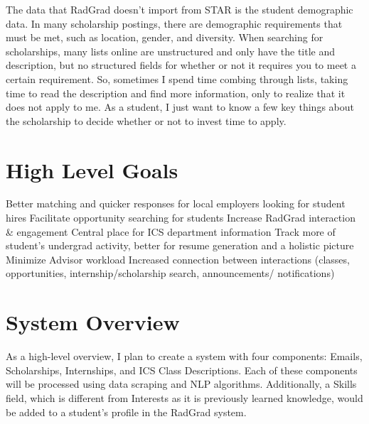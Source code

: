 \documentclass[english]{proposalnsf}
\begin{document}
	The data that RadGrad doesn’t import from STAR is the student demographic data.
	In many scholarship postings, there are demographic requirements that must be met, such as location, gender, and diversity. When searching for scholarships, many lists online are unstructured and only have the title and description, but no structured fields for whether or not it requires you to meet a certain requirement. So, sometimes I spend time combing through lists, taking time to read the description and find more information, only to realize that it does not apply to me. As a student, I just want to know a few key things about the scholarship to decide whether or not to invest time to apply.
	
	
	\section{High Level Goals}
	\label{Goals}
	\begin{outline}
		\1  Better matching and quicker responses for local employers looking for student hires
		\1  Facilitate opportunity searching for students
		\1 Increase RadGrad interaction \& engagement
		\1 Central place for ICS department information
		\1 Track more of student's undergrad activity, better for resume generation and a holistic picture
		\1 Minimize Advisor workload
		\1  Increased connection between interactions (classes, opportunities, internship/scholarship search, announcements/ notifications)
	\end{outline}
	\newpage
	
	
	
	
	\section{System Overview}
	\label{system-overview}
	As a high-level overview, I plan to create a system with four components: Emails, Scholarships, Internships, and ICS Class Descriptions. Each of these components will be processed using data scraping and NLP algorithms. Additionally, a Skills field, which is different from Interests as it is previously learned knowledge, would be added to a student’s profile in the RadGrad system.
	
\end{document}
